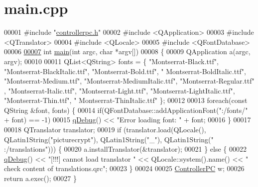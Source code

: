 \hypertarget{main_8cpp_source}{}\section{main.\+cpp}
\label{main_8cpp_source}

\begin{DoxyCode}
00001 \textcolor{preprocessor}{#include "\hyperlink{controllerpc_8h}{controllerpc.h}"}
00002 \textcolor{preprocessor}{#include <QApplication>}
00003 \textcolor{preprocessor}{#include <QTranslator>}
00004 \textcolor{preprocessor}{#include <QLocale>}
00005 \textcolor{preprocessor}{#include <QFontDatabase>}
00006 
\hypertarget{main_8cpp_source.tex_l00007}{}\hyperlink{main_8cpp_a0ddf1224851353fc92bfbff6f499fa97}{00007} \textcolor{keywordtype}{int} \hyperlink{main_8cpp_a0ddf1224851353fc92bfbff6f499fa97}{main}(\textcolor{keywordtype}{int} argc, \textcolor{keywordtype}{char} *argv[])
00008 \{
00009     QApplication a(argc, argv);
00010 
00011     QList<QString> fonts = \{ \textcolor{stringliteral}{"Montserrat-Black.ttf"}, \textcolor{stringliteral}{"Montserrat-BlackItalic.ttf"}, \textcolor{stringliteral}{"Montserrat-Bold.ttf"}, \textcolor{stringliteral}{"
      Montserrat-BoldItalic.ttf"}, \textcolor{stringliteral}{"Montserrat-Medium.ttf"}, \textcolor{stringliteral}{"Montserrat-MediumItalic.ttf"}, \textcolor{stringliteral}{"Montserrat-Regular.ttf"}
      , \textcolor{stringliteral}{"Montserrat-Italic.ttf"}, \textcolor{stringliteral}{"Montserrat-Light.ttf"}, \textcolor{stringliteral}{"Montserrat-LightItalic.ttf"}, \textcolor{stringliteral}{"Montserrat-Thin.ttf"}, \textcolor{stringliteral}{"
      Montserrat-ThinItalic.ttf"} \};
00012 
00013     \textcolor{keywordflow}{foreach}(\textcolor{keyword}{const} QString &font, fonts) \{
00014         \textcolor{keywordflow}{if}(QFontDatabase::addApplicationFont(\textcolor{stringliteral}{":/fonts/"} + font) == -1)
00015             \hyperlink{mainpage_8dox_a8bceae478e38c215e869968270c33543}{qDebug}() << \textcolor{stringliteral}{"Error loading font: "} + font;
00016     \}
00017 
00018     QTranslator translator;
00019     \textcolor{keywordflow}{if} (translator.load(QLocale(), QLatin1String(\textcolor{stringliteral}{"picturecrypt"}), QLatin1String(\textcolor{stringliteral}{"\_"}), QLatin1String(\textcolor{stringliteral}{"
      :/translations"}))) \{
00020         a.installTranslator(&translator);
00021     \} \textcolor{keywordflow}{else} \{
00022         \hyperlink{mainpage_8dox_a8bceae478e38c215e869968270c33543}{qDebug}() << \textcolor{stringliteral}{"[!!!] cannot load translator "} << QLocale::system().name() << \textcolor{stringliteral}{" check content of
       translations.qrc"};
00023     \}
00024 
00025     \hyperlink{class_controller_p_c}{ControllerPC} w;
00026     \textcolor{keywordflow}{return} a.exec();
00027 \}
\end{DoxyCode}
